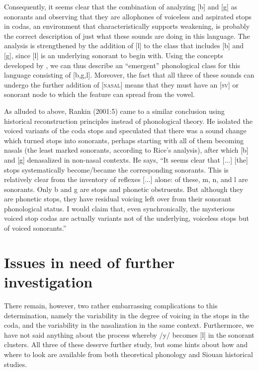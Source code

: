 \documentclass[output=paper]{LSP/langsci}
\begin{document}
Consequently, it seems clear that the combination of analyzing [b] and [g] as sonorants and observing that they are allophones of voiceless and aspirated stops in codas, an environment that characteristically supports weakening, is probably the correct description of just what these sounds are doing in this language. The analysis is strengthened by the addition of [l] to the class that includes [b] and [g], since [l] is an underlying sonorant to begin with. Using the concepts developed by \citet{Mielke2008}, we can thus describe an ``emergent'' phonological class for this language consisting of [b,g,l]. Moreover, the fact that all three of these sounds can undergo the further addition of [\textsc{nasal}] means that they must have an [\textsc{sv}] or sonorant node to which the feature can spread from the vowel.

As alluded to above, Rankin (2001:5) came to a similar conclusion using historical reconstruction principles instead of phonological theory. He isolated the voiced variants of the coda stops and speculated that there was a sound change which turned stops into sonorants, perhaps starting with all of them becoming nasals (the least marked sonorants, according to Rice's  analysis), after which [b] and [g] denasalized in non-nasal contexts. He says, ``It seems clear that [...] [the] stops systematically become/became the corresponding sonorants. This is relatively clear from the inventory of reflexes [...] alone: of these, m, n,  and l are sonorants. Only b and g are stops and phonetic obstruents. But although they are phonetic stops, they have residual voicing left over from their sonorant phonological status. I would claim that, even synchronically, the mysterious voiced stop codas are actually variants not of the underlying, voiceless stops but of voiced sonorants.''

\section{Issues in need of further investigation}

There remain, however, two rather embarrassing complications to this determination, namely the variability in the degree of voicing in the stops in the coda, and the variability in the nasalization in the same context. Furthermore, we have not said anything about the process whereby /y/ becomes [l] in the sonorant clusters. All three of these deserve further study, but some hints about how and where to look are available from both theoretical phonology and Siouan historical studies.
\end{document}
